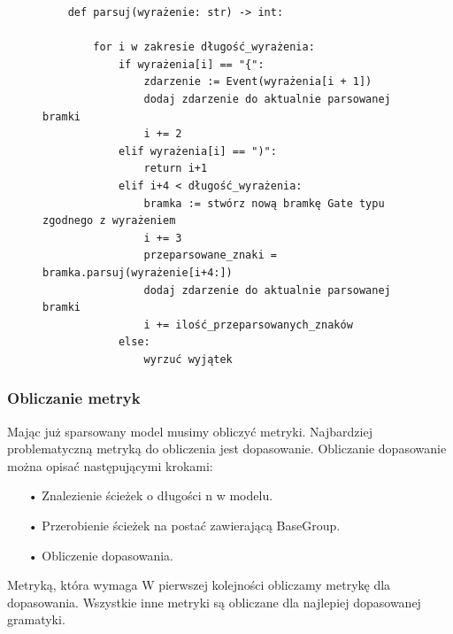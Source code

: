 \begin{figure}[!ht]
\lstset{caption=Parser gramatyki, captionpos=b}
\lstset{label=src:passive, frame=single}
\begin{lstlisting}
    def parsuj(wyrażenie: str) -> int:

        for i w zakresie długość_wyrażenia:
            if wyrażenia[i] == "{":
                zdarzenie := Event(wyrażenia[i + 1])
                dodaj zdarzenie do aktualnie parsowanej bramki 
                i += 2
            elif wyrażenia[i] == ")":
                return i+1
            elif i+4 < długość_wyrażenia:
                bramka := stwórz nową bramkę Gate typu zgodnego z wyrażeniem 
                i += 3
                przeparsowane_znaki = bramka.parsuj(wyrażenie[i+4:])
                dodaj zdarzenie do aktualnie parsowanej bramki 
                i += ilość_przeparsowanych_znaków
            else:
                wyrzuć wyjątek
\end{lstlisting}
\end{figure}

\subsubsection{Obliczanie metryk}
Mając już sparsowany model musimy obliczyć metryki. Najbardziej problematyczną metryką do obliczenia jest dopasowanie. Obliczanie dopasowanie można opisać następującymi krokami:
\begin{itemize}
  \item[•] Znalezienie ścieżek o długości n w modelu.
  \item[•] Przerobienie ścieżek na postać zawierającą BaseGroup.
  \item[•] Obliczenie dopasowania.
\end{itemize}
Metryką, która wymaga 
W pierwszej kolejności obliczamy metrykę dla dopasowania. Wszystkie inne metryki są obliczane dla najlepiej dopasowanej gramatyki.
 
